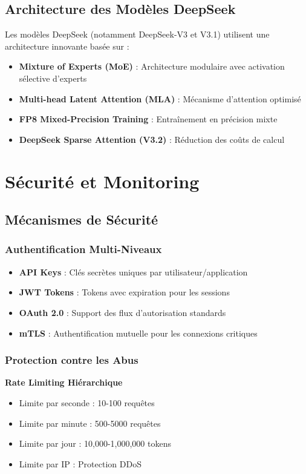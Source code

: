 \documentclass[12pt,a4paper]{article}
\begin{document}
\subsection{Architecture des Modèles DeepSeek}
Les modèles DeepSeek (notamment DeepSeek-V3 et V3.1) utilisent une architecture innovante basée sur :
\begin{itemize}[noitemsep]
    \item \textbf{Mixture of Experts (MoE)} : Architecture modulaire avec activation sélective d'experts
    \item \textbf{Multi-head Latent Attention (MLA)} : Mécanisme d'attention optimisé
    \item \textbf{FP8 Mixed-Precision Training} : Entraînement en précision mixte
    \item \textbf{DeepSeek Sparse Attention (V3.2)} : Réduction des coûts de calcul
\end{itemize}

\newpage
\section{Sécurité et Monitoring}

\subsection{Mécanismes de Sécurité}

\subsubsection{Authentification Multi-Niveaux}
\begin{itemize}[leftmargin=2cm]
    \item \textbf{API Keys} : Clés secrètes uniques par utilisateur/application
    \item \textbf{JWT Tokens} : Tokens avec expiration pour les sessions
    \item \textbf{OAuth 2.0} : Support des flux d'autorisation standards
    \item \textbf{mTLS} : Authentification mutuelle pour les connexions critiques
\end{itemize}

\subsubsection{Protection contre les Abus}
\begin{tcolorbox}[colback=yellow!10, colframe=orange!60!black]
    \textbf{Rate Limiting Hiérarchique}
    \begin{itemize}[noitemsep]
        \item Limite par seconde : 10-100 requêtes
        \item Limite par minute : 500-5000 requêtes
        \item Limite par jour : 10,000-1,000,000 tokens
        \item Limite par IP : Protection DDoS
    \end{itemize}
\end{tcolorbox}
\end{document}
